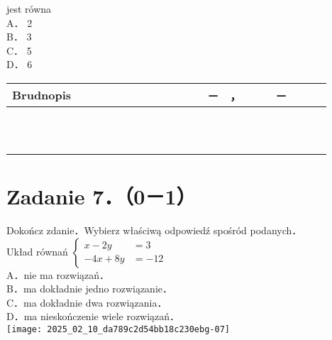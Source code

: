 \documentclass[10pt]{article}
\begin{document}
jest równa\\
A． 2\\
B． 3\\
C． 5\\
D． 6

\begin{center}
\begin{tabular}{|c|c|c|c|c|c|c|c|c|c|c|c|c|c|c|c|c|c|c|c|c|c|c|}
\hline
\multicolumn{4}{|l|}{Brudnopis} &  &  &  &  &  &  &  &  &  &  &  & － & ， &  &  & － &  &  &  \\
\hline
 &  &  &  &  &  &  &  &  &  &  &  &  &  &  &  &  &  &  &  &  &  &  \\
\hline
 &  &  &  &  &  &  &  &  &  &  &  &  &  &  &  &  &  &  &  &  &  &  \\
\hline
 &  &  &  &  &  &  &  &  &  &  &  &  &  &  &  &  &  &  &  &  &  &  \\
\hline
 &  &  &  &  &  &  &  &  &  &  &  &  &  &  &  &  &  &  &  &  &  &  \\
\hline
 &  &  &  &  &  &  &  &  &  &  &  &  &  &  &  &  &  &  &  &  &  &  \\
\hline
 &  &  &  &  &  &  &  &  &  &  &  &  &  &  &  &  &  &  &  &  &  &  \\
\hline
 &  &  &  &  &  &  &  &  &  &  &  &  &  &  &  &  &  &  &  &  &  &  \\
\hline
 &  &  &  &  &  &  &  &  &  &  &  &  &  &  &  &  &  &  &  &  &  &  \\
\hline
 &  &  &  &  &  &  &  &  &  &  &  &  &  &  &  &  &  &  &  &  &  &  \\
\hline
 &  &  &  &  &  &  &  &  &  &  &  &  &  &  &  &  &  &  &  &  &  &  \\
\hline
 &  &  &  &  &  &  &  &  &  &  &  &  &  &  &  &  &  &  &  &  &  &  \\
\hline
\end{tabular}
\end{center}

\section*{Zadanie 7．（0－1）}
Dokończ zdanie．Wybierz właściwą odpowiedź spośród podanych．\\
Układ równań \(\left\{\begin{aligned} x-2 y & =3 \\ -4 x+8 y & =-12\end{aligned}\right.\)\\
A．nie ma rozwiązań．\\
B．ma dokładnie jedno rozwiązanie．\\
C．ma dokładnie dwa rozwiązania．\\
D．ma nieskończenie wiele rozwiązań．\\
\texttt{[image: 2025\_02\_10\_da789c2d54bb18c230ebg-07]}
\end{document}
